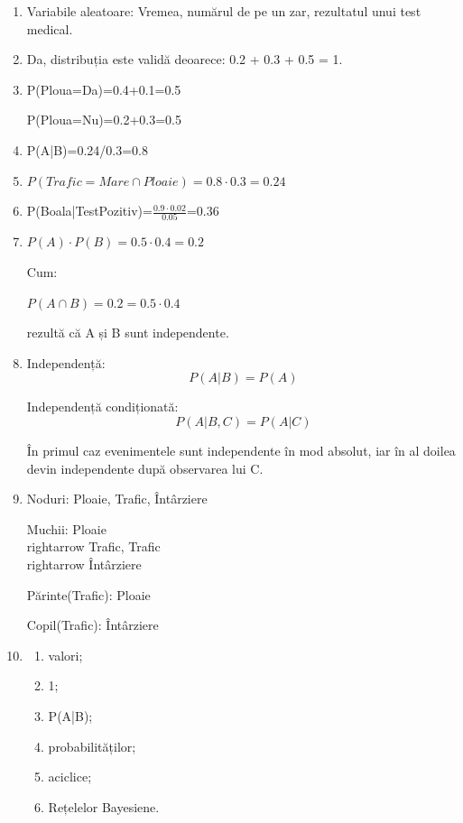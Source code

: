 \documentclass[12pt,a4paper]{article}
\begin{document}
\begin{enumerate}

\item Variabile aleatoare:
Vremea, numărul de pe un zar, rezultatul unui test medical.

\item Da, distribuția este validă deoarece:
0.2 + 0.3 + 0.5 = 1.

\item
P(Ploua=Da)=0.4+0.1=0.5

P(Ploua=Nu)=0.2+0.3=0.5

\item
P(A|B)=0.24/0.3=0.8

\item
$P(Trafic=Mare \cap Ploaie)=0.8 \cdot 0.3=0.24$

\item
P(Boala|TestPozitiv)=$\frac{0.9 \cdot 0.02}{0.05}$=0.36

\item
$P(A)\cdot P(B)=0.5\cdot0.4=0.2$

Cum:

$P(A\cap B)=0.2=0.5\cdot0.4$

rezultă că A și B sunt independente.

\item

Independență:
\[
P(A|B)=P(A)
\]

Independență condiționată:
\[
P(A|B,C)=P(A|C)
\]

În primul caz evenimentele sunt independente în mod absolut, iar în al doilea devin independente după observarea lui C.

\item

Noduri:
Ploaie, Trafic, Întârziere

Muchii:
Ploaie \\rightarrow Trafic,
Trafic \\rightarrow Întârziere

Părinte(Trafic):
Ploaie

Copil(Trafic):
Întârziere

\item

\begin{enumerate}
\item valori;
\item 1;
\item P(A|B);
\item probabilităților;
\item aciclice;
\item Rețelelor Bayesiene.
\end{enumerate}

\end{enumerate}
\end{document}

